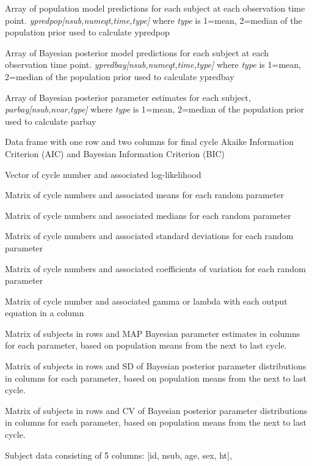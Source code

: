 \documentclass[a4paper]{book}
\begin{document}
\begin{Value}
\begin{ldescription}
\item[\code{ypredpop }] Array of population model predictions for each subject at each observation time point.
\emph{ypredpop[nsub,numeqt,time,type]} where \emph{type} is 1=mean, 2=median of the population prior used to calculate ypredpop
\item[\code{ypredbay }] Array of Bayesian posterior model predictions for each subject at each observation time point.
\emph{ypredbay[nsub,numeqt,time,type]} where \emph{type} is 1=mean, 2=median of the population prior used to calculate ypredbay
\item[\code{parbay }] Array of Bayesian posterior parameter estimates for each subject,
\emph{parbay[nsub,nvar,type]} where \emph{type} is 1=mean, 2=median of the population prior used to calculate parbay
\item[\code{ic }] Data frame with one row and two columns for final cycle Akaike Information Criterion (AIC) and Bayesian Information Criterion (BIC)
\item[\code{ilog }] Vector of cycle number and associated log-likelihood
\item[\code{imean }] Matrix of cycle numbers and associated means for each random parameter
\item[\code{imed }] Matrix of cycle numbers and associated medians for each random parameter
\item[\code{isd }] Matrix of cycle numbers and associated standard deviations for each random parameter
\item[\code{icv }] Matrix of cycle numbers and associated coefficients of variation for each random parameter
\item[\code{igamlam }] Matrix of cycle number and associated gamma or lambda with each output equation in a column
\item[\code{lpar }] Matrix of subjects in rows and MAP Bayesian parameter estimates in columns for each parameter,
based on population means from the next to last cycle.
\item[\code{lsd }] Matrix of subjects in rows and SD of Bayesian posterior parameter distributions in columns for each parameter,
based on population means from the next to last cycle.
\item[\code{lcv }] Matrix of subjects in rows and CV of Bayesian posterior parameter distributions in columns for each parameter,
based on population means from the next to last cycle.
\item[\code{sdata }] Subject data consisting of 5 columns: [id,  nsub,  age,  sex,  ht],

\end{ldescription}
\end{Value}
\end{document}
